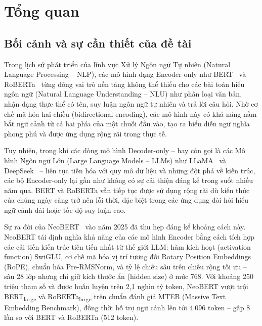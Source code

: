 \chapter{Tổng quan}
\label{chap:intro}

\section{Bối cảnh và sự cần thiết của đề tài}
\label{sec:background}

Trong lịch sử phát triển của lĩnh vực Xử lý Ngôn ngữ Tự nhiên (Natural Language
Processing -- NLP), các mô hình dạng Encoder-only như BERT~\cite{devlin2019bert} và
RoBERTa~\cite{liu2019roberta} từng đóng vai trò nền tảng không thể thiếu cho các bài
toán hiểu ngôn ngữ (Natural Language Understanding -- NLU) như phân loại văn bản,
nhận dạng thực thể có tên, suy luận ngôn ngữ tự nhiên và trả lời câu hỏi. Nhờ cơ
chế mã hóa hai chiều (bidirectional encoding), các mô hình này có khả năng nắm bắt
ngữ cảnh từ cả hai phía của một chuỗi đầu vào, tạo ra biểu diễn ngữ nghĩa phong phú
và được ứng dụng rộng rãi trong thực tế.

Tuy nhiên, trong khi các dòng mô hình Decoder-only -- hay còn gọi là các Mô hình
Ngôn ngữ Lớn (Large Language Models -- LLMs) như LLaMA~\cite{dubey2024llama} và
DeepSeek~\cite{deepseek2025} -- liên tục tiến hóa với quy mô dữ liệu và những đột
phá về kiến trúc, các bộ Encoder-only lại gần như không có sự cải thiện đáng kể trong
suốt nhiều năm qua. BERT và RoBERTa vẫn tiếp tục được sử dụng rộng rãi dù kiến thức
của chúng ngày càng trở nên lỗi thời, đặc biệt trong các ứng dụng đòi hỏi hiểu ngữ
cảnh dài hoặc tốc độ suy luận cao.

Sự ra đời của NeoBERT~\cite{lebreton2025neobert} vào năm 2025 đã thu hẹp đáng kể
khoảng cách này. NeoBERT tái định nghĩa khả năng của các mô hình Encoder bằng cách
tích hợp các cải tiến kiến trúc tiên tiến nhất từ thế giới LLM: hàm kích hoạt
(activation function) SwiGLU, cơ chế mã hóa vị trí tương đối Rotary Position Embeddings (RoPE), chuẩn hóa
Pre-RMSNorm, và tỷ lệ chiều sâu trên chiều rộng tối ưu -- sâu 28 lớp nhưng chỉ
giữ kích thước ẩn (hidden size) ở mức 768. Với khoảng 250 triệu tham số và được huấn luyện trên 2,1 nghìn tỷ token,
NeoBERT vượt trội BERT\textsubscript{large} và RoBERTa\textsubscript{large} trên chuẩn
đánh giá MTEB (Massive Text Embedding Benchmark), đồng thời hỗ trợ ngữ cảnh lên
tới 4.096 token -- gấp 8 lần so với BERT và RoBERTa (512 token).


